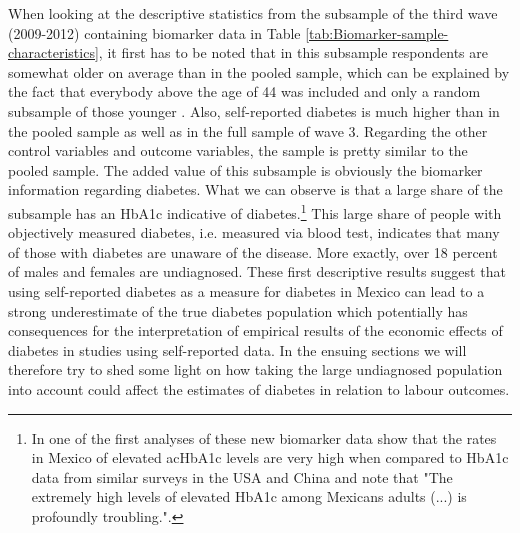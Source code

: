 \documentclass[12pt,english,british]{article}
\begin{document}
When looking at the descriptive statistics from the subsample of the third wave (2009-2012) containing biomarker data in Table \ref{tab:Biomarker-sample-characteristics}, it first has to be noted that in this subsample respondents are somewhat older on average than in the pooled sample, which can be explained by the fact that everybody above the age of 44 was included and only a random subsample of those younger \cite{Crimmins2015}. Also, self-reported diabetes is much higher than in the pooled sample as well as in the full sample of wave 3. Regarding the other control variables and outcome variables, the sample is pretty similar to the pooled sample. The added value of this subsample is obviously the biomarker information regarding diabetes. What we can observe is that a large share of the subsample has an \ac{HbA1c} indicative of diabetes.\footnote{In one of the first analyses of these new biomarker data\citet{Frankenberg2015} show that the rates in Mexico of elevated ac{HbA1c} levels are very high when compared to \ac{HbA1c} data from similar surveys in the \ac{USA} and China and note that "The extremely high levels of elevated HbA1c among Mexicans adults (...) is profoundly troubling.".} This large share of people with objectively measured diabetes, i.e. measured via blood test, indicates that many of those with diabetes are unaware of the disease. More exactly, over 18 percent of males and females are undiagnosed. These first descriptive results suggest that using self-reported diabetes as a measure for diabetes in Mexico can lead to a strong underestimate of the true diabetes population which potentially has consequences for the interpretation of empirical results of the economic effects of diabetes in studies using self-reported data. In the ensuing sections we will therefore try to shed some light on how taking the large undiagnosed population into account could affect the estimates of diabetes in relation to labour outcomes. 
\end{document}
